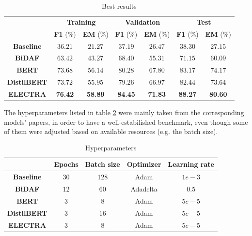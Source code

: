 \documentclass[a4paper,10pt]{report}
\begin{document}
\begin{table}[h]
  \center
  \begin{tabular}{|c|c|c|c|c|c|c|}
    \hline
    \multirow{2}{*}{}   & \multicolumn{2}{c|}{\textbf{Training}} & \multicolumn{2}{c|}{\textbf{Validation}} & \multicolumn{2}{c|}{\textbf{Test}}                                                          \\ \cline{2-7}
                        & \textbf{F1} (\%) & \textbf{EM} (\%) & \textbf{F1} (\%) & \textbf{EM} (\%) & \textbf{F1} (\%) & \textbf{EM} (\%) \\ \hline
    \textbf{Baseline}   & $36.21$ & $21.27$ & $37.19$ & $26.47$ & $38.30$ & $27.15$ \\ \hline
    \textbf{BiDAF}      & $63.42$ & $43.27$ & $68.40$ & $55.31$ & $71.15$ & $60.09$ \\ \hline
    \textbf{BERT}       & $73.68$ & $56.14$ & $80.28$ & $67.80$ & $83.17$ & $74.17$ \\ \hline
    \textbf{DistilBERT} & $73.72$ & $55.95$ & $79.26$ & $66.97$ & $82.44$ & $73.64$ \\ \hline
    \textbf{ELECTRA}    & \textbf{76.42} & \textbf{58.89} & \textbf{84.45} & \textbf{71.83} & \textbf{88.27} & \textbf{80.60} \\ \hline
  \end{tabular}
  \caption{Best results}
  \label{table:results}
\end{table}

The hyperparameters listed in table \ref{table:hyperparameters} were mainly taken from the corresponding models' papers, in order to have a well-estabilished benchmark, even though some of them were adjusted based on available resources (e.g. the batch size).

\begin{table}[h]
  \center
  \begin{tabular}{|c|c|c|c|c|}
    \hline
                        & \textbf{Epochs} & \textbf{Batch size} & \textbf{Optimizer} & \textbf{Learning rate} \\ \hline
    \textbf{Baseline}   & $30$            & $128$               & Adam               & $1e-3$                 \\ \hline
    \textbf{BiDAF}      & $12$            & $60$                & Adadelta           & $0.5$                  \\ \hline
    \textbf{BERT}       & $3$             & $8$                 & Adam               & $5e-5$                 \\ \hline
    \textbf{DistilBERT} & $3$             & $16$                & Adam               & $5e-5$                 \\ \hline
    \textbf{ELECTRA}    & $3$             & $8$                 & Adam               & $5e-5$                 \\ \hline
  \end{tabular}
  \caption{Hyperparameters}
  \label{table:hyperparameters}
\end{table}
\end{document}
